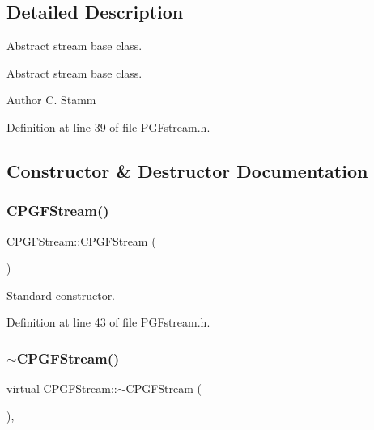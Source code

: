 \subsection{Detailed Description}
Abstract stream base class. 

Abstract stream base class. \begin{DoxyAuthor}{Author}
C. Stamm 
\end{DoxyAuthor}


Definition at line 39 of file P\+G\+Fstream.\+h.



\subsection{Constructor \& Destructor Documentation}
\mbox{\label{classCPGFStream_a2384e79147a1c375e00722b1ef038121}} 
\subsubsection{\texorpdfstring{CPGFStream()}{CPGFStream()}}
{\footnotesize\ttfamily C\+P\+G\+F\+Stream\+::\+C\+P\+G\+F\+Stream (\begin{DoxyParamCaption}{ }\end{DoxyParamCaption})\hspace{0.3cm}{\ttfamily [inline]}}



Standard constructor. 



Definition at line 43 of file P\+G\+Fstream.\+h.


\begin{DoxyCode}{0}

\end{DoxyCode}
\mbox{\label{classCPGFStream_a32718570401ef16b8f778fa08cdb6a7a}} 
\subsubsection{\texorpdfstring{$\sim$CPGFStream()}{~CPGFStream()}}
{\footnotesize\ttfamily virtual C\+P\+G\+F\+Stream\+::$\sim$\+C\+P\+G\+F\+Stream (\begin{DoxyParamCaption}{ }\end{DoxyParamCaption})\hspace{0.3cm}{\ttfamily [inline]}, {\ttfamily [virtual]}}



